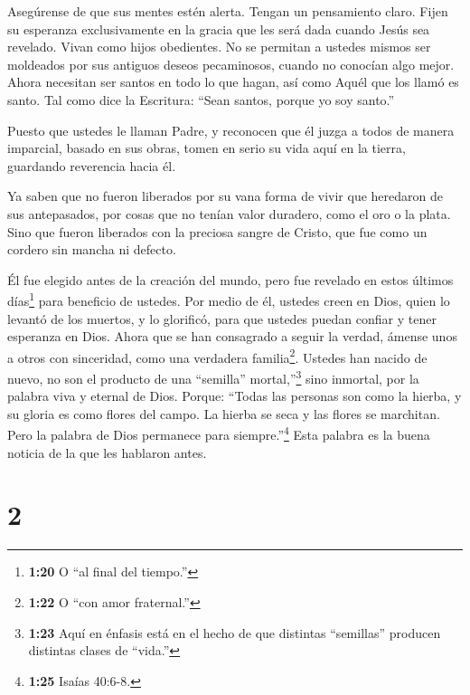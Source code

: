  Asegúrense de que sus mentes estén alerta. Tengan un
pensamiento claro. Fijen su esperanza exclusivamente en la gracia que
les será dada cuando Jesús sea revelado.  Vivan como hijos
obedientes. No se permitan a ustedes mismos ser moldeados por sus
antiguos deseos pecaminosos, cuando no conocían algo mejor.
 Ahora necesitan ser santos en todo lo que hagan, así como
Aquél que los llamó es santo.  Tal como dice la Escritura:
``Sean santos, porque yo soy santo.''

 Puesto que ustedes le llaman Padre, y reconocen que él
juzga a todos de manera imparcial, basado en sus obras, tomen en serio
su vida aquí en la tierra, guardando reverencia hacia él.

 Ya saben que no fueron liberados por su vana forma de
vivir que heredaron de sus antepasados, por cosas que no tenían valor
duradero, como el oro o la plata.  Sino que fueron
liberados con la preciosa sangre de Cristo, que fue como un cordero sin
mancha ni defecto.

 Él fue elegido antes de la creación del mundo, pero fue
revelado en estos últimos días\footnote{\textbf{1:20} O ``al final del
  tiempo.''} para beneficio de ustedes.  Por medio de él,
ustedes creen en Dios, quien lo levantó de los muertos, y lo glorificó,
para que ustedes puedan confiar y tener esperanza en Dios. 
Ahora que se han consagrado a seguir la verdad, ámense unos a otros con
sinceridad, como una verdadera familia\footnote{\textbf{1:22} O ``con
  amor fraternal.''}.  Ustedes han nacido de nuevo, no son
el producto de una ``semilla'' mortal,''\footnote{\textbf{1:23} Aquí en
  énfasis está en el hecho de que distintas ``semillas'' producen
  distintas clases de ``vida.''} sino inmortal, por la palabra viva y
eternal de Dios.  Porque: ``Todas las personas son como la
hierba, y su gloria es como flores del campo. La hierba se seca y las
flores se marchitan.  Pero la palabra de Dios permanece
para siempre.''\footnote{\textbf{1:25} Isaías 40:6-8.} Esta palabra es
la buena noticia de la que les hablaron antes.

\hypertarget{section-1}{%
\section{2}\label{section-1}}

